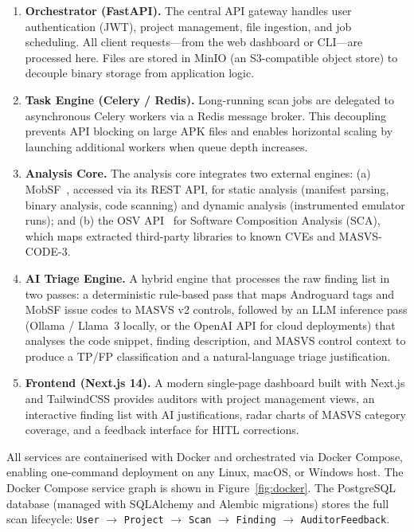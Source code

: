 \documentclass[preprint,12pt,a4paper]{elsarticle}
\begin{document}
\begin{enumerate}
  \item \textbf{Orchestrator (FastAPI).} The central API gateway handles user
    authentication (JWT), project management, file ingestion, and job
    scheduling. All client requests---from the web dashboard or CLI---are
    processed here. Files are stored in MinIO (an S3-compatible object store)
    to decouple binary storage from application logic.
  \item \textbf{Task Engine (Celery / Redis).} Long-running scan jobs are
    delegated to asynchronous Celery workers via a Redis message broker. This
    decoupling prevents API blocking on large APK files and enables
    horizontal scaling by launching additional workers when queue depth
    increases.
  \item \textbf{Analysis Core.} The analysis core integrates two external
    engines: (a) MobSF~\cite{mobsf}, accessed via its REST API, for static
    analysis (manifest parsing, binary analysis, code scanning) and dynamic
    analysis (instrumented emulator runs); and (b) the OSV
    API~\cite{osv_api} for Software Composition Analysis (SCA), which maps
    extracted third-party libraries to known CVEs and MASVS-CODE-3.
  \item \textbf{AI Triage Engine.} A hybrid engine that processes the raw
    finding list in two passes: a deterministic rule-based pass that maps
    Androguard tags and MobSF issue codes to MASVS v2 controls, followed by
    an LLM inference pass (Ollama / Llama~3 locally, or the OpenAI API for
    cloud deployments) that analyses the code snippet, finding description,
    and MASVS control context to produce a TP/FP classification and a
    natural-language triage justification.
  \item \textbf{Frontend (Next.js 14).} A modern single-page dashboard
    built with Next.js and TailwindCSS provides auditors with project
    management views, an interactive finding list with AI justifications,
    radar charts of MASVS category coverage, and a feedback interface for
    HITL corrections.
\end{enumerate}

All services are containerised with Docker and orchestrated via Docker
Compose, enabling one-command deployment
on any Linux, macOS, or Windows host. The Docker Compose service graph is shown in Figure~\ref{fig:docker}. The PostgreSQL database (managed
with SQLAlchemy and Alembic migrations) stores the full scan lifecycle:
\texttt{User} $\to$ \texttt{Project} $\to$ \texttt{Scan} $\to$
\texttt{Finding} $\to$ \texttt{AuditorFeedback}.
\end{document}
